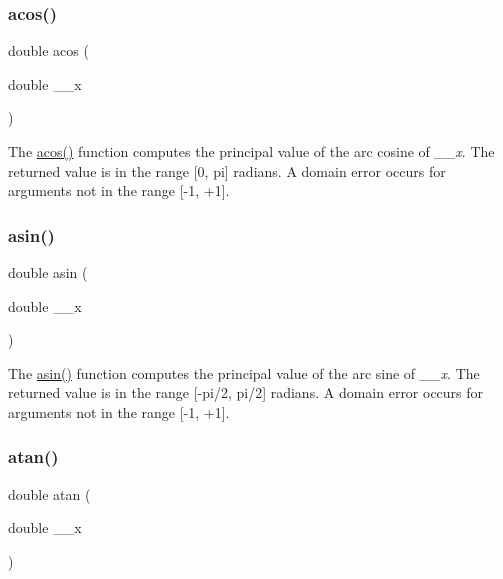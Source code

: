 \subsubsection{\texorpdfstring{acos()}{acos()}}
{\footnotesize\ttfamily double acos (\begin{DoxyParamCaption}\item[{double}]{\+\_\+\+\_\+x }\end{DoxyParamCaption})}

The \hyperlink{group__avr__math_gaa3a144378cb5470be25699ce14b5998b}{acos()} function computes the principal value of the arc cosine of {\itshape \+\_\+\+\_\+x}. The returned value is in the range \mbox{[}0, pi\mbox{]} radians. A domain error occurs for arguments not in the range \mbox{[}-\/1, +1\mbox{]}. \mbox{\label{group__avr__math_ga3d13e59a7e1b64fc5427ed1164356866}} 
\subsubsection{\texorpdfstring{asin()}{asin()}}
{\footnotesize\ttfamily double asin (\begin{DoxyParamCaption}\item[{double}]{\+\_\+\+\_\+x }\end{DoxyParamCaption})}

The \hyperlink{group__avr__math_ga3d13e59a7e1b64fc5427ed1164356866}{asin()} function computes the principal value of the arc sine of {\itshape \+\_\+\+\_\+x}. The returned value is in the range \mbox{[}-\/pi/2, pi/2\mbox{]} radians. A domain error occurs for arguments not in the range \mbox{[}-\/1, +1\mbox{]}. \mbox{\label{group__avr__math_ga91781e24e088dac3595e3fee50fcfb6d}} 
\subsubsection{\texorpdfstring{atan()}{atan()}}
{\footnotesize\ttfamily double atan (\begin{DoxyParamCaption}\item[{double}]{\+\_\+\+\_\+x }\end{DoxyParamCaption})}

